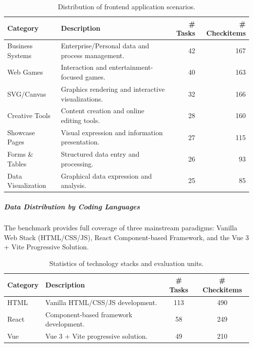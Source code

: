 \documentclass{article}
\theoremstyle{definition}
\begin{document}
\begin{table}[h]
\centering
\small
\caption{Distribution of frontend application scenarios.}
\begin{tabular}{lp{7cm}rr}
\toprule
\textbf{Category} & \textbf{Description} & \textbf{\# Tasks} & \textbf{\# Checkitems} \\
\midrule
Business Systems & Enterprise/Personal data and process management. & 42 & 167 \\
Web Games & Interaction and entertainment-focused games. & 40 & 163\\
SVG/Canvas & Graphics rendering and interactive visualizations. & 32 & 166\\
Creative Tools & Content creation and online editing tools. & 28 & 160\\
Showcase Pages & Visual expression and information presentation. & 27 & 115\\
Forms \& Tables & Structured data entry and processing. & 26 & 93\\
Data Visualization & Graphical data expression and analysis. & 25 & 85\\
\bottomrule
\end{tabular}

\end{table}

\subparagraph{Data Distribution by Coding Languages}
The benchmark provides full coverage of three mainstream paradigms: Vanilla Web Stack (HTML/CSS/JS), React Component-based Framework, and the Vue 3 + Vite Progressive Solution.
\begin{table}[h]
\centering
\caption{Statistics of technology stacks and evaluation units.}
\begin{tabular}{llcc}
\toprule
\textbf{Category} & \textbf{Description} & \textbf{\# Tasks} & \textbf{\# Checkitems} \\
\midrule
HTML & Vanilla HTML/CSS/JS development. & 113 & 490 \\
React & Component-based framework development. & 58 & 249 \\
Vue & Vue 3 + Vite progressive solution. & 49 & 210 \\
\bottomrule
\end{tabular}
\end{table}
\end{document}
